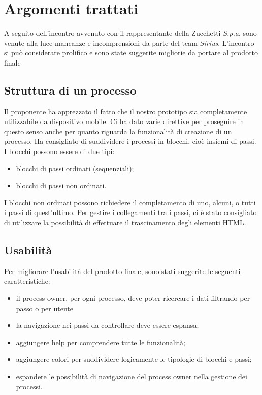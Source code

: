 \section{Argomenti trattati}

A seguito dell'incontro avvenuto con il rappresentante della Zucchetti \textit{S.p.a}, sono venute alla luce mancanze e incomprensioni da parte del team \emph{Sirius}. L'incontro si può considerare prolifico e sono state suggerite migliorie da portare al prodotto finale

\subsection{Struttura di un processo}

Il proponente ha apprezzato il fatto che il nostro prototipo sia completamente utilizzabile da dispositivo mobile. Ci ha dato varie direttive per proseguire in questo senso anche per quanto riguarda la funzionalità di creazione di un processo.
Ha consigliato di suddividere i processi in blocchi, cioè insiemi di passi.
I blocchi possono essere di due tipi:
\begin{itemize}
	\item blocchi di passi ordinati (sequenziali);
	\item blocchi di passi non ordinati.
\end{itemize}
I blocchi non ordinati possono richiedere il completamento di uno, alcuni, o tutti i passi di quest'ultimo.
Per gestire i collegamenti tra i passi, ci è stato consigliato di utilizzare la possibilità di effettuare il trascinamento degli elementi HTML.


\subsection{Usabilità}
Per migliorare l'usabilità del prodotto finale, sono stati suggerite le seguenti caratteristiche:
\begin{itemize}
	\item il process owner, per ogni processo, deve poter ricercare i dati filtrando per passo o per utente	
	\item la navigazione nei passi da controllare deve essere espansa;
	\item aggiungere help per comprendere tutte le funzionalità;
	\item aggiungere colori per suddividere logicamente le tipologie di blocchi e passi;
	\item espandere le possibilità di navigazione del process owner nella gestione dei processi.
\end{itemize}

